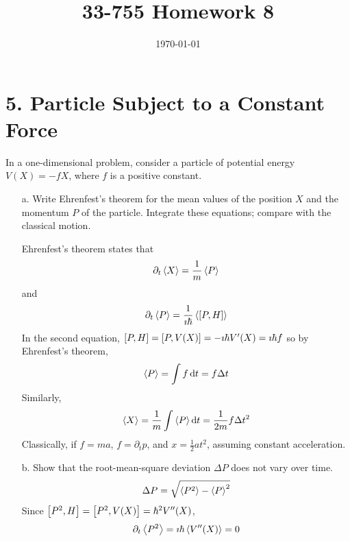 \documentclass[a4paper,twoside]{article}
\title{33-755 Homework 8}
\date{\today}
\begin{document}
\maketitle

\section*{5. Particle Subject to a Constant Force}
In a one-dimensional problem, consider a particle of potential energy $ V(X) = -fX $, where $ f $ is a positive constant.
\begin{itemize}
    \item[a.] Write Ehrenfest's theorem for the mean values of the position $ X $ and the momentum $ P $ of the particle. Integrate these equations; compare with the classical motion.
        \begin{problem}
            Ehrenfest's theorem states that
            \begin{equation}
                \partial_t \expval{X} = \frac{1}{m} \expval{P}
            \end{equation}
            and
            \begin{equation}
                \partial_t \expval{P} = \frac{1}{\imath\hbar} \expval{\comm{P}{H}}
            \end{equation}
            In the second equation, $ \comm{P}{H} = \comm{P}{V(X)} = -\imath\hbar V'(X) = \imath\hbar f $ so by Ehrenfest's theorem,
            \begin{equation}
                \expval{P} = \int f \dd{t} = f\Delta t
            \end{equation}
            Similarly,
            \begin{equation}
                \expval{X} = \frac{1}{m} \int \expval{P} \dd{t} = \frac{1}{2m}f\Delta t^2
            \end{equation}
            Classically, if $ f = ma $, $ f = \partial_t p $, and $ x = \frac{1}{2} at^2 $, assuming constant acceleration.
        \end{problem}
    \item[b.] Show that the root-mean-square deviation $ \Delta P $ does not vary over time.
        \begin{equation}
            \Delta P = \sqrt{\expval{P^2} - \expval{P}^2}
        \end{equation}
        Since $ \comm{P^2}{H} = \comm{P^2}{V(X)} = \hbar^2 V''(X) $,
        \begin{equation}
            \partial_t\expval{P^2} = \imath\hbar\expval{V''(X)} = 0

\end{equation}
\end{itemize}
\end{document}
